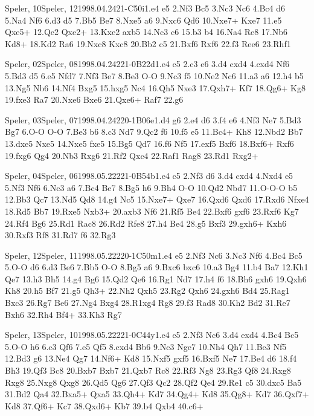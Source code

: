 \documentclass[twocolumn,a4paper,10pt]{report}
\begin{document}
\begin{chessgame}{Speler, 10}{Speler, 12}{1998.04.24}{21}{\textonehalf-\textonehalf}{C50i}{1.e4 e5 2.Nf3 Bc5 3.Nc3 Nc6 4.Bc4 d6 5.Na4 Nf6 6.d3 d5 7.Bb5 Be7 8.Nxe5 a6 9.Nxc6 Qd6 10.Nxe7+ Kxe7 11.e5 Qxe5+ 12.Qe2 Qxe2+ 13.Kxe2 axb5 14.Nc3 c6 15.b3 b4 16.Na4 Re8 17.Nb6 Kd8+ 18.Kd2 Ra6 19.Nxc8 Kxc8 20.Bb2 c5 21.Bxf6 Rxf6 22.f3 Ree6 23.Rhf1}\end{chessgame}
\begin{chessgame}{Speler, 02}{Speler, 08}{1998.04.24}{22}{1-0}{B22d}{1.e4 c5 2.c3 e6 3.d4 cxd4 4.cxd4 Nf6 5.Bd3 d5 6.e5 Nfd7 7.Nf3 Be7 8.Be3 O-O 9.Nc3 f5 10.Ne2 Nc6 11.a3 a6 12.h4 b5 13.Ng5 Nb6 14.Nf4 Bxg5 15.hxg5 Nc4 16.Qh5 Nxe3 17.Qxh7+ Kf7 18.Qg6+ Kg8 19.fxe3 Ra7 20.Nxe6 Bxe6 21.Qxe6+ Raf7 22.g6}\end{chessgame}
\begin{chessgame}{Speler, 03}{Speler, 07}{1998.04.24}{22}{0-1}{B06e}{1.d4 g6 2.e4 d6 3.f4 e6 4.Nf3 Ne7 5.Bd3 Bg7 6.O-O O-O 7.Be3 b6 8.c3 Nd7 9.Qc2 f6 10.f5 e5 11.Bc4+ Kh8 12.Nbd2 Bb7 13.dxe5 Nxe5 14.Nxe5 fxe5 15.Bg5 Qd7 16.f6 Nf5 17.exf5 Bxf6 18.Bxf6+ Rxf6 19.fxg6 Qg4 20.Nb3 Rxg6 21.Rf2 Qxc4 22.Raf1 Rag8 23.Rd1 Rxg2+}\end{chessgame}
\begin{chessgame}{Speler, 04}{Speler, 06}{1998.05.22}{22}{1-0}{B54b}{1.e4 c5 2.Nf3 d6 3.d4 cxd4 4.Nxd4 e5 5.Nf3 Nf6 6.Nc3 a6 7.Bc4 Be7 8.Bg5 h6 9.Bh4 O-O 10.Qd2 Nbd7 11.O-O-O b5 12.Bb3 Qc7 13.Nd5 Qd8 14.g4 Nc5 15.Nxe7+ Qxe7 16.Qxd6 Qxd6 17.Rxd6 Nfxe4 18.Rd5 Bb7 19.Rxe5 Nxb3+ 20.axb3 Nf6 21.Rf5 Be4 22.Bxf6 gxf6 23.Rxf6 Kg7 24.Rf4 Bg6 25.Rd1 Rac8 26.Rd2 Rfe8 27.h4 Be4 28.g5 Bxf3 29.gxh6+ Kxh6 30.Rxf3 Rf8 31.Rd7 f6 32.Rg3}\end{chessgame}
\begin{chessgame}{Speler, 12}{Speler, 11}{1998.05.22}{22}{0-1}{C50m}{1.e4 e5 2.Nf3 Nc6 3.Nc3 Nf6 4.Bc4 Bc5 5.O-O d6 6.d3 Be6 7.Bb5 O-O 8.Bg5 a6 9.Bxc6 bxc6 10.a3 Bg4 11.b4 Ba7 12.Kh1 Qe7 13.h3 Bh5 14.g4 Bg6 15.Qd2 Qe6 16.Rg1 Nd7 17.h4 f6 18.Bh6 gxh6 19.Qxh6 Kh8 20.h5 Bf7 21.g5 Qh3+ 22.Nh2 Qxh5 23.Rg2 Qxh6 24.gxh6 Bd4 25.Rag1 Bxc3 26.Rg7 Be6 27.Ng4 Bxg4 28.R1xg4 Rg8 29.f3 Rad8 30.Kh2 Bd2 31.Re7 Bxh6 32.Rh4 Bf4+ 33.Kh3 Rg7}\end{chessgame}
\begin{chessgame}{Speler, 13}{Speler, 10}{1998.05.22}{22}{1-0}{C44y}{1.e4 e5 2.Nf3 Nc6 3.d4 exd4 4.Bc4 Bc5 5.O-O h6 6.c3 Qf6 7.e5 Qf5 8.cxd4 Bb6 9.Nc3 Nge7 10.Nh4 Qh7 11.Be3 Nf5 12.Bd3 g6 13.Ne4 Qg7 14.Nf6+ Kd8 15.Nxf5 gxf5 16.Bxf5 Ne7 17.Be4 d6 18.f4 Bh3 19.Qf3 Bc8 20.Bxb7 Bxb7 21.Qxb7 Rc8 22.Rf3 Ng8 23.Rg3 Qf8 24.Rxg8 Rxg8 25.Nxg8 Qxg8 26.Qd5 Qg6 27.Qf3 Qc2 28.Qf2 Qe4 29.Re1 c5 30.dxc5 Ba5 31.Bd2 Qa4 32.Bxa5+ Qxa5 33.Qh4+ Kd7 34.Qg4+ Kd8 35.Qg8+ Kd7 36.Qxf7+ Kd8 37.Qf6+ Kc7 38.Qxd6+ Kb7 39.b4 Qxb4 40.c6+}\end{chessgame}
\end{document}
